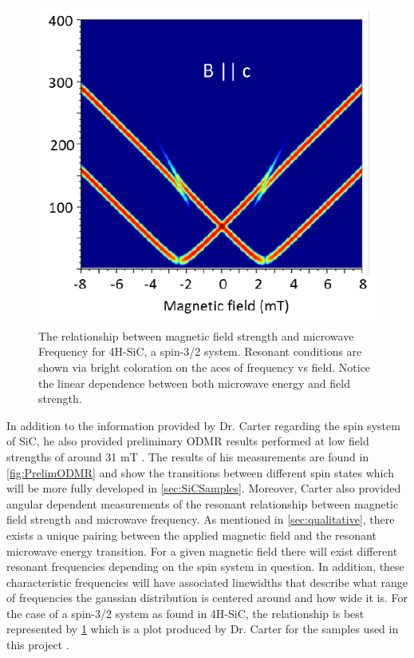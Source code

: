 \documentclass[oneside, astronomy, noacknowlegments]{BYUPhys}
\begin{document}
\begin{figure}
    \centerline{\includegraphics{MFRelationship_fig}}
    \caption[Magnetic field and microwave frequency relationship]{\label{fig:MFRelationship}
     The relationship between magnetic field strength and microwave Frequency for 4H-SiC, a spin-3/2 system. Resonant conditions are shown via bright coloration on the aces of frequency vs field. Notice the linear dependence between both microwave energy and field strength.}
 \end{figure}

In addition to the information provided by Dr. Carter regarding the spin system of SiC, he also provided preliminary ODMR results performed at low field strengths of around 31 mT \cite{RefWorks:doc:5892964ee4b0499fa95c5108}. The results of his measurements are found in \ref{fig:PrelimODMR} and show the transitions between different spin states which will be more fully developed in \ref{sec:SiCSamples}. Moreover, Carter also provided angular dependent measurements of the resonant relationship between magnetic field strength and microwave frequency. As mentioned in \ref{sec:qualitative}, there exists a unique pairing between the applied magnetic field and the resonant microwave energy transition. For a given magnetic field there will exist different resonant frequencies depending on the spin system in question. In addition, these characteristic frequencies will have associated linewidths that describe what range of frequencies the gaussian distribution is centered around and how wide it is. For the case of a spin-3/2 system as found in 4H-SiC, the relationship is best represented by \ref{fig:MFRelationship} which is a plot produced by Dr. Carter for the samples used in this project \cite{RefWorks:doc:5892964ee4b0499fa95c5108}.
 
\end{document}
